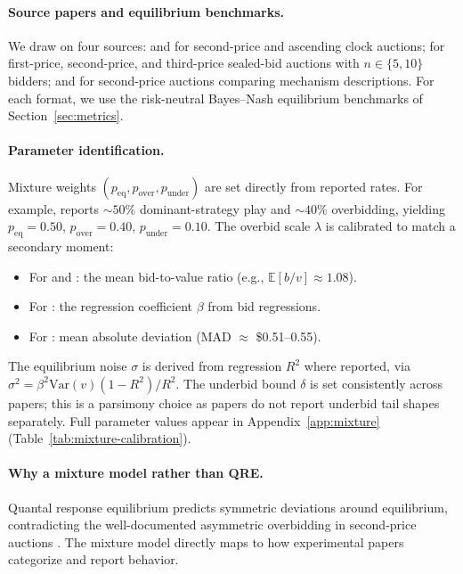\paragraph{Source papers and equilibrium benchmarks.}
We draw on four sources: \citet{li2017obviously} and
\citet{breitmoser2022obviousness} for second-price and ascending clock
auctions; \citet{kagel1993independent} for first-price, second-price, and
third-price sealed-bid auctions with $n \in \{5, 10\}$ bidders; and
\citet{gonczarowski2023strategyproofness} for second-price auctions comparing
mechanism descriptions. For each format, we use the risk-neutral Bayes--Nash
equilibrium benchmarks of Section~\ref{sec:metrics}.

\paragraph{Parameter identification.}
Mixture weights $(p_{\text{eq}}, p_{\text{over}}, p_{\text{under}})$ are set
directly from reported rates. For example, \citet{li2017obviously} reports
${\sim}50\%$ dominant-strategy play and ${\sim}40\%$ overbidding, yielding
$p_{\text{eq}} = 0.50$, $p_{\text{over}} = 0.40$, $p_{\text{under}} = 0.10$.
The overbid scale $\lambda$ is calibrated to match a secondary moment:
\begin{itemize}
  \item For \citet{li2017obviously} and \citet{breitmoser2022obviousness}: the
  mean bid-to-value ratio (e.g., $\mathbb{E}[b/v] \approx 1.08$).
  \item For \citet{kagel1993independent}: the regression coefficient $\beta$
  from bid regressions.
  \item For \citet{gonczarowski2023strategyproofness}: mean absolute deviation
  (MAD $\approx$ \$0.51--0.55).
\end{itemize}
The equilibrium noise $\sigma$ is derived from regression $R^2$ where reported,
via $\sigma^2 = \beta^2 \text{Var}(v)(1-R^2)/R^2$. The underbid bound $\delta$
is set consistently across papers; this is a parsimony choice as papers do not
report underbid tail shapes separately. Full parameter values appear in
Appendix~\ref{app:mixture} (Table~\ref{tab:mixture-calibration}).

\paragraph{Why a mixture model rather than QRE.}
Quantal response equilibrium predicts symmetric deviations around equilibrium,
contradicting the well-documented asymmetric overbidding in second-price
auctions \citep{kagel1993independent}. The mixture model directly maps to how
experimental papers categorize and report behavior.

